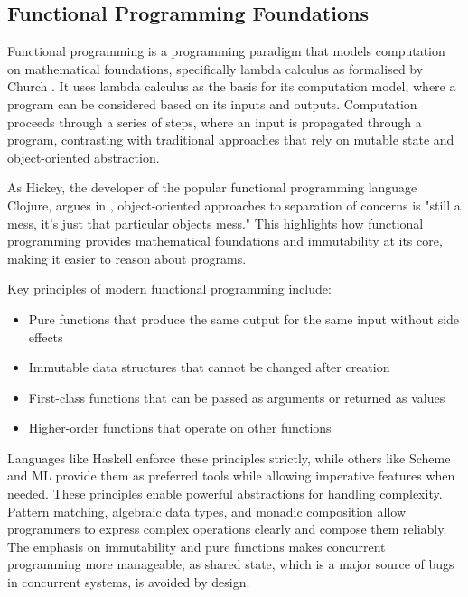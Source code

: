 \documentclass[final]{cmpreport_02}
\begin{document}
\subsection{Functional Programming Foundations}

Functional programming is a programming paradigm that models computation on mathematical foundations, specifically lambda calculus as formalised by Church \cite{church1936unsolvable}. It uses lambda calculus as the basis for its computation model, where a program can be considered based on its inputs and outputs. Computation proceeds through a series of steps, where an input is propagated through a program, contrasting with traditional approaches that rely on mutable state and object-oriented abstraction.\newline

As Hickey, the developer of the popular functional programming language Clojure, argues in \cite{hickey2009there}, object-oriented approaches to separation of concerns is "still a mess, it's just that particular objects mess." This highlights how functional programming provides mathematical foundations and immutability at its core, making it easier to reason about programs.\newline

Key principles of modern functional programming include:
\begin{itemize}[noitemsep]
    \item Pure functions that produce the same output for the same input without side effects
    \item Immutable data structures that cannot be changed after creation
    \item First-class functions that can be passed as arguments or returned as values
    \item Higher-order functions that operate on other functions
\end{itemize}

Languages like Haskell enforce these principles strictly, while others like Scheme and ML provide them as preferred tools while allowing imperative features when needed. These principles enable powerful abstractions for handling complexity. Pattern matching, algebraic data types, and monadic composition allow programmers to express complex operations clearly and compose them reliably. The emphasis on immutability and pure functions makes concurrent programming more manageable, as shared state, which is a major source of bugs in concurrent systems, is avoided by design.\newline
\end{document}
